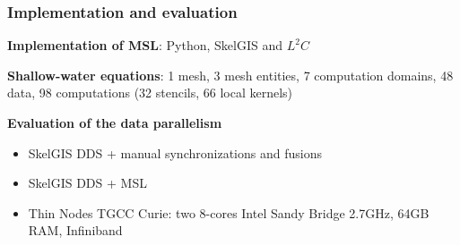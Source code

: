 \documentclass{beamer}
\begin{document}

\begin{frame}
\frametitle{Implementation and evaluation}
\textbf{Implementation of MSL}: Python, SkelGIS and $L^2C$

\medskip
\textbf{Shallow-water equations}: 1 mesh, 3 mesh entities, 7 computation domains, 48 data, 98 computations (32 stencils, 66 local kernels)

\medskip
\textbf{Evaluation of the data parallelism}
\begin{itemize}
\item SkelGIS DDS + manual synchronizations and fusions
\item SkelGIS DDS + MSL
\item Thin Nodes TGCC Curie: two 8-cores Intel Sandy Bridge 2.7GHz, 64GB RAM, Infiniband
\end{itemize}
\end{frame}
\end{document}
